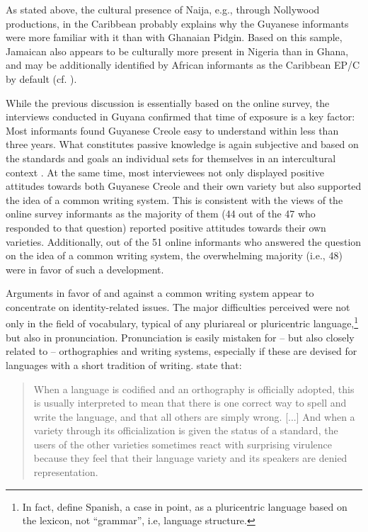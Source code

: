 \documentclass[output=paper,colorlinks,citecolor=brown]{langscibook}
\begin{document}
As stated above, the cultural presence of Naija, e.g., through Nollywood productions, in the Caribbean probably explains why the Guyanese informants were more familiar with it than with Ghanaian Pidgin. Based on this sample, Jamaican also appears to be culturally more present in Nigeria than in Ghana, and may be additionally identified by African informants as the Caribbean EP/C by default (cf. ).

While the previous discussion is essentially based on the online survey, the interviews conducted in Guyana confirmed that time of exposure is a key factor: Most informants found Guyanese Creole easy to understand within less than three years. What constitutes passive knowledge is again subjective and based on the standards and goals an individual sets for themselves in an intercultural context \citep[cf.][]{Dornyei_Otto_1998,Dornyei_Csizer_2005}. At the same time, most interviewees not only displayed positive attitudes towards both Guyanese Creole and their own variety but also supported the idea of a common writing system. This is consistent with the views of the online survey informants as the majority of them (44 out of the 47 who responded to that question) reported positive attitudes towards their own varieties. Additionally, out of the 51 online informants who answered the question on the idea of a common writing system, the overwhelming majority (i.e., 48) were in favor of such a development.

Arguments in favor of and against a common writing system appear to concentrate on identity-related issues. The major difficulties perceived were not only in the field of vocabulary, typical of any pluriareal or pluricentric language,\footnote{In fact, \citet[382]{Berschin_FernandezSevilla_Felizberger_2012} define Spanish, a case in point, as a pluricentric language based on the lexicon, not “grammar”, i.e, language structure.} but also in pronunciation. Pronunciation is easily mistaken for – but also closely related to – orthographies and writing systems, especially if these are devised for languages with a short tradition of writing. \citet[192--193]{Schieffelin_Doucet_1994} state that:

\begin{quote}
    When a language is codified and an orthography is officially adopted, this is usually interpreted to mean that there is one correct way to spell and write the language, and that all others are simply wrong. [...] And when a variety through its officialization is given the status of a standard, the users of the other varieties sometimes react with surprising virulence because they feel that their language variety and its speakers are denied representation.
\end{quote}
\end{document}
